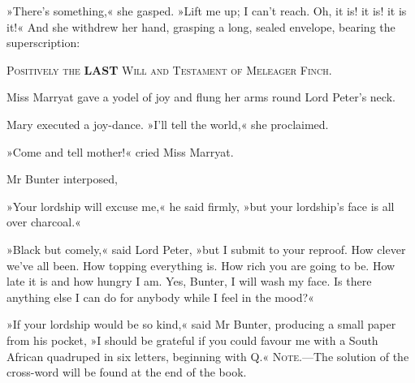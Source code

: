 »There's something,« she gasped. »Lift me up; I can't reach. Oh, it is! it is! it is it!« And she withdrew her hand, grasping a long, sealed envelope, bearing the superscription:

\begin{center}\scshape
Positively the \textbf{LAST} Will and Testament of Meleager Finch.
\end{center}

Miss Marryat gave a yodel of joy and flung her arms round Lord Peter's neck.

Mary executed a joy-dance. »I'll tell the world,« she proclaimed.

»Come and tell mother!« cried Miss Marryat.

Mr Bunter interposed,

»Your lordship will excuse me,« he said firmly, »but your lordship's face is all over charcoal.«

»Black but comely,« said Lord Peter, »but I submit to your reproof. How clever we've all been. How topping everything is. How rich you are going to be. How late it is and how hungry I am. Yes, Bunter, I will wash my face. Is there anything else I can do for anybody while I feel in the mood?«

»If your lordship would be so kind,« said Mr Bunter, producing a small paper from his pocket, »I should be grateful if you could favour me with a South African quadruped in six letters, beginning with Q.«
\vfill
\textsc{Note}.—The solution of the cross-word will be found at the end of the book.